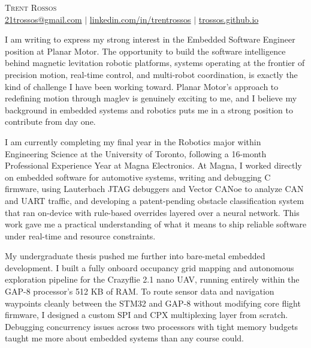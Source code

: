 \documentclass[12pt]{letter}
\begin{document}
\AddToShipoutPictureBG{%
\color{gr}
\AtPageUpperLeft{\rule[-1.3in]{\paperwidth}{1.3in}}
}

\begin{center}
  {\fontsize{28}{0}\selectfont\scshape Trent Rossos}\\[4pt]
  \href{mailto:21trossos@gmail.com}{21trossos@gmail.com} $|$
  \href{https://linkedin.com/in/trentrossos}{linkedin.com/in/trentrossos} $|$
  \href{https://trossos.github.io}{{trossos.github.io}}
\end{center}

\vspace{0.3in}



\vspace{-0.1in}
\setlength\parindent{12pt} %
I am writing to express my strong interest in the Embedded Software Engineer position at Planar Motor. The opportunity to build the software intelligence behind magnetic levitation robotic platforms, systems operating at the frontier of precision motion, real-time control, and multi-robot coordination, is exactly the kind of challenge I have been working toward. Planar Motor’s approach to redefining motion through maglev is genuinely exciting to me, and I believe my background in embedded systems and robotics puts me in a strong position to contribute from day one.

I am currently completing my final year in the Robotics major within Engineering Science at the University of Toronto, following a 16-month Professional Experience Year at Magna Electronics. At Magna, I worked directly on embedded software for automotive systems, writing and debugging C firmware, using Lauterbach JTAG debuggers and Vector CANoe to analyze CAN and UART traffic, and developing a patent-pending obstacle classification system that ran on-device with rule-based overrides layered over a neural network. This work gave me a practical understanding of what it means to ship reliable software under real-time and resource constraints.

My undergraduate thesis pushed me further into bare-metal embedded development. I built a fully onboard occupancy grid mapping and autonomous exploration pipeline for the Crazyflie 2.1 nano UAV, running entirely within the GAP-8 processor’s 512 KB of RAM. To route sensor data and navigation waypoints cleanly between the STM32 and GAP-8 without modifying core flight firmware, I designed a custom SPI and CPX multiplexing layer from scratch. Debugging concurrency issues across two processors with tight memory budgets taught me more about embedded systems than any course could.
\end{document}
